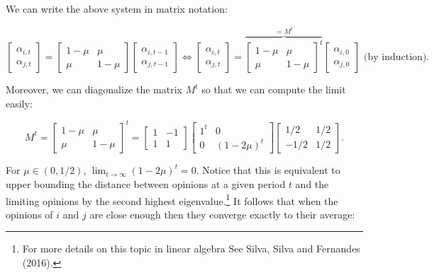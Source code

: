 \documentclass{article}
\begin{document}
\noindent  We can write the above system in matrix notation: 

\[
 \begin{bmatrix}
\alpha_{i,t} \\
\alpha_{j,t}
 \end{bmatrix}
=
 \begin{bmatrix}
1 - \mu & \mu    \\
\mu  & 1 - \mu  \end{bmatrix}
 \begin{bmatrix}
\alpha_{i,t-1}  \\
\alpha_{j,t-1}
 \end{bmatrix} 
\Leftrightarrow
 \begin{bmatrix}
\alpha_{i,t} \\
\alpha_{j,t}
 \end{bmatrix}
=
 \overbrace{\begin{bmatrix} 
1 - \mu & \mu    \\
\mu  & 1 - \mu  \end{bmatrix} ^t }^{= M^t}
 \begin{bmatrix} 
\alpha_{i,0}  \\
\alpha_{j,0}
 \end{bmatrix} \text{ (by induction). }\] 
 
\noindent Moreover, we can diagonalize the matrix $M^t$ so that we can compute the limit easily: 
 
 \[ 
 M^t =
{ \begin{bmatrix} 
1 - \mu & \mu    \\
\mu  & 1 - \mu  \end{bmatrix} }^t 
=
 \begin{bmatrix}
1  & -1    \\
1  & 1
 \end{bmatrix}
 \begin{bmatrix} 
1^t  & 0    \\
0  & (1- 2\mu)^t
 \end{bmatrix} 
  \begin{bmatrix}
1/2  & 1/2    \\
-1/2  & 1/2
 \end{bmatrix}.
 \] 

\noindent For $\mu \in (0,1/2)$, $\lim_{t \rightarrow \infty} (1- 2 \mu)^t = 0$. Notice that this is equivalent to upper bounding the distance between opinions at a given period $t$ and the limiting opinions by the second highest eigenvalue.\footnote{For more details on this topic in linear algebra See Silva, Silva and Fernandes (2016)\cite{silva}.} It follows that when the opinions of $i$ and $j$ are close enough then they converge exactly to their average: 
\end{document}

